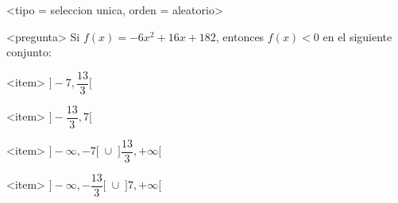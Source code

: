 <tipo = seleccion unica, orden = aleatorio>

<pregunta>
Si $f(x) = -6x^2 +16x +182$, entonces $f(x) < 0$ en el siguiente conjunto:


<item>
$\bigg]-7, \dfrac{13}{3}\bigg[$

<item>
$\bigg]-\dfrac{13}{3}, 7\bigg[$

<item>
$\bigg]{-}\infty, -7\bigg[\;\cup\; \bigg]\dfrac{13}{3},+\infty\bigg[$

<item>
$\bigg]{-}\infty, -\dfrac{13}{3}\bigg[\;\cup\; \bigg]7,+\infty\bigg[$

 

